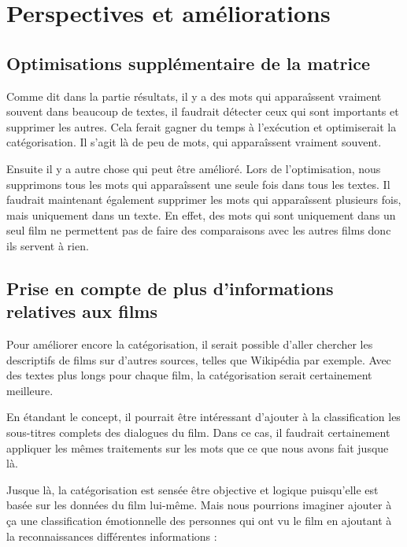 \chapter{Perspectives et améliorations}
\section{Optimisations supplémentaire de la matrice}

Comme dit dans la partie résultats, il y a des mots qui apparaîssent vraiment souvent dans beaucoup de textes, il faudrait détecter ceux qui sont importants et supprimer les autres. Cela ferait gagner du temps à l'exécution et optimiserait la catégorisation. Il s'agit là de peu de mots, qui apparaîssent vraiment souvent.

Ensuite il y a autre chose qui peut être amélioré. Lors de l'optimisation, nous supprimons tous les mots qui apparaîssent une seule fois dans tous les textes. Il faudrait maintenant également supprimer les mots qui apparaîssent plusieurs fois, mais uniquement dans un texte. En effet, des mots qui sont uniquement dans un seul film ne permettent pas de faire des comparaisons avec les autres films donc ils servent à rien.

\section{Prise en compte de plus d'informations relatives aux films}

Pour améliorer encore la catégorisation, il serait possible d'aller chercher les descriptifs de films sur d'autres sources, telles que Wikipédia par exemple. Avec des textes plus longs pour chaque film, la catégorisation serait certainement meilleure.

En étandant le concept, il pourrait être intéressant d'ajouter à la classification les sous-titres complets des dialogues du film. Dans ce cas, il faudrait certainement appliquer les mêmes traitements sur les mots que ce que nous avons fait jusque là.

Jusque là, la catégorisation est sensée être objective et logique puisqu'elle est basée sur les données du film lui-même. Mais nous pourrions imaginer ajouter à ça une classification émotionnelle des personnes qui ont vu le film en ajoutant à la reconnaissances différentes informations : \\

